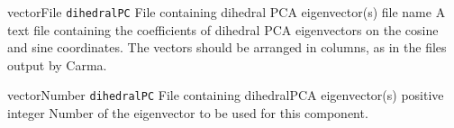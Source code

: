 {\begin{cvcoptions}

\item %

\item %

\item %
  \key
    {vectorFile}{%
    \texttt{dihedralPC}}{%
    File containing dihedral PCA eigenvector(s)}{%
    file name}{%
    A text file containing the coefficients of dihedral PCA eigenvectors on the
    cosine and sine coordinates. The vectors should be arranged in columns,
    as in the files output by Carma.\cite{Glykos2006}}

\item %
  \key
    {vectorNumber}{%
    \texttt{dihedralPC}}{%
    File containing dihedralPCA eigenvector(s)}{%
    positive integer}{%
    Number of the eigenvector to be used for this component.}
\end{cvcoptions}

} %

